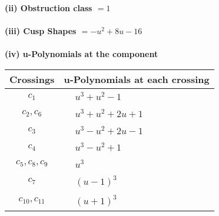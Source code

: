 \documentclass[1p]{elsarticle_modified}
\theoremstyle{definition}
\begin{document}
\flushleft \textbf{(ii) Obstruction class $= 1$}\\~\\
\flushleft \textbf{(iii) Cusp Shapes $= - u^2+8 u-16$}\\~\\
\newpage\renewcommand{\arraystretch}{1}
\flushleft \textbf{(iv) u-Polynomials at the component}\newline \\
\begin{tabular}{m{50pt}|m{274pt}}
Crossings & \hspace{64pt}u-Polynomials at each crossing \\
\hline $$\begin{aligned}c_{1}\end{aligned}$$&$\begin{aligned}
&u^3+u^2-1
\end{aligned}$\\
\hline $$\begin{aligned}c_{2},c_{6}\end{aligned}$$&$\begin{aligned}
&u^3+u^2+2 u+1
\end{aligned}$\\
\hline $$\begin{aligned}c_{3}\end{aligned}$$&$\begin{aligned}
&u^3- u^2+2 u-1
\end{aligned}$\\
\hline $$\begin{aligned}c_{4}\end{aligned}$$&$\begin{aligned}
&u^3- u^2+1
\end{aligned}$\\
\hline $$\begin{aligned}c_{5},c_{8},c_{9}\end{aligned}$$&$\begin{aligned}
&u^3
\end{aligned}$\\
\hline $$\begin{aligned}c_{7}\end{aligned}$$&$\begin{aligned}
&(u-1)^3
\end{aligned}$\\
\hline $$\begin{aligned}c_{10},c_{11}\end{aligned}$$&$\begin{aligned}
&(u+1)^3
\end{aligned}$\\
\hline
\end{tabular}\\~\\
\end{document}
